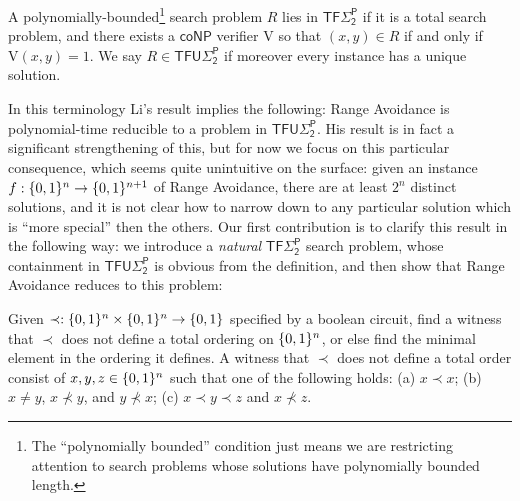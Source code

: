 \begin{definition}

A polynomially-bounded\footnote{The ``polynomially bounded'' condition just means we are restricting attention to search problems whose solutions have polynomially bounded length.} search problem $R$ lies in $\mathsf{TF\Sigma_2^P}$ if it is a total search problem, and there exists a $\mathsf{coNP}$ verifier $\mathrm{V}$ so that $(x,y) \in R$ if and only if $\mathrm{V}(x,y)=1$. We say $R \in \mathsf{TFU\Sigma_2^P}$ if moreover every instance has a unique solution.
\end{definition}
In this terminology Li's result implies the following: Range Avoidance is polynomial-time reducible to a problem in $\mathsf{TFU\Sigma_2^P}$. His result is in fact a significant strengthening of this, but for now we focus on this particular consequence, which seems quite unintuitive on the surface: given an instance $f: \{0,1\}^n \to \{0,1\}^{n+1}$ of Range Avoidance, there are at least $2^{n}$ distinct solutions, and it is not clear how to narrow down to any particular solution which is ``more special'' then the others. Our first contribution is to clarify this result in the following way: we introduce a \emph{natural} $\mathsf{TF\Sigma_2^P}$ search problem, whose containment in $\mathsf{TFU\Sigma_2^P}$ is obvious from the definition, and then show that Range Avoidance reduces to this problem: 
\begin{definition}
Given $\prec: \{0,1\}^n \times \{0,1\}^n \to \{0,1\}$ specified by a boolean circuit, find a witness that $\prec$ does not define a total ordering on $\{0,1\}^n$, or else find the minimal element in the ordering it defines. A witness that $\prec$ does not define a total order consist of $x,y,z \in \{0,1\}^n$ such that one of the following holds: (a) $x \prec x$; (b) $x\neq y$, $x \not\prec y $, and $ y \not\prec x$; (c) $x \prec y \prec z$ and $x \not\prec z$.
\end{definition}

